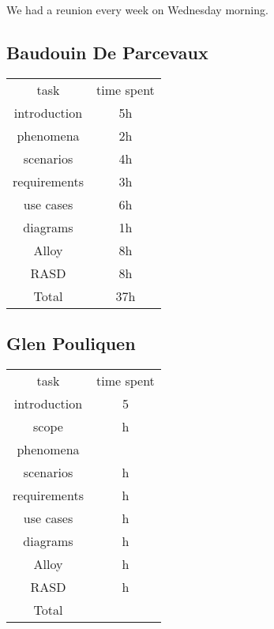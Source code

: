 We had a reunion every week on Wednesday morning. 
\subsection{Baudouin De Parcevaux}
\begin{tabular}{| c | c | }
	task & time spent \\
	introduction & 5h \\
 	phenomena & 2h \\
	scenarios & 4h\\
 	requirements & 3h\\
	use cases & 6h\\
	diagrams & 1h\\
	Alloy & 8h\\
	RASD & 8h\\
	Total & 37h \\
\end{tabular}

\subsection{Glen Pouliquen}
\begin{tabular}{| c | c | }
	task & time spent \\
	introduction & 5 \\
	scope & h\\
	phenomena & \\
	scenarios & h\\
	requirements & h\\
	use cases & h\\
	diagrams & h\\
	Alloy & h\\
	RASD & h\\
	Total & \\
\end{tabular}